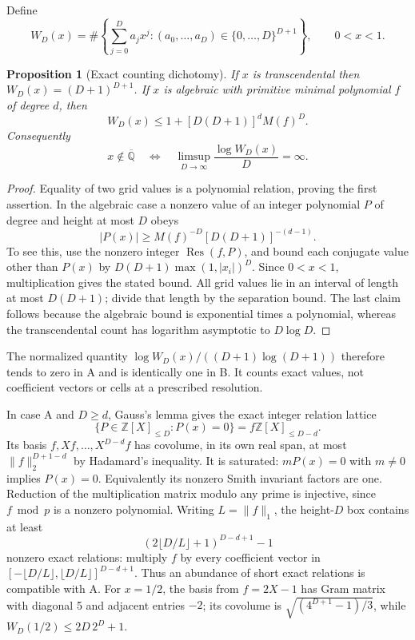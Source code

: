 \documentclass[11pt,a4paper]{article}
\newcommand{\Z}{\mathbb Z}
\newcommand{\Qbar}{\overline{\mathbb Q}}
\newtheorem{proposition}[theorem]{Proposition}
\theoremstyle{definition}
\theoremstyle{remark}
\numberwithin{equation}{section}
\begin{document}
Define
\[
 W_D(x)=\#\left\{\sum_{j=0}^D a_jx^j:
                 (a_0,\ldots,a_D)\in\{0,\ldots,D\}^{D+1}\right\},
 \qquad 0<x<1.
\]
\begin{proposition}[Exact counting dichotomy]\label{wr:prop-counting}
If \(x\) is transcendental then \(W_D(x)=(D+1)^{D+1}\). If \(x\) is
algebraic with primitive minimal polynomial \(f\) of degree \(d\), then
\begin{equation}\label{wr:eq-counting-bound}
 W_D(x)\le1+[D(D+1)]^d M(f)^D.
\end{equation}
Consequently
\[
 x\notin\Qbar
 \quad\Longleftrightarrow\quad
 \limsup_{D\to\infty}\frac{\log W_D(x)}D=\infty.
\]
\end{proposition}
\begin{proof}
Equality of two grid values is a polynomial relation, proving the first
assertion. In the algebraic case a nonzero value of an integer polynomial
\(P\) of degree and height at most \(D\) obeys
\[
 |P(x)|\ge M(f)^{-D}[D(D+1)]^{-(d-1)}.
\]
To see this, use the nonzero integer \(\operatorname{Res}(f,P)\), and
bound each conjugate value other than \(P(x)\) by
\(D(D+1)\max(1,|x_i|)^D\). Since \(0<x<1\), multiplication gives the
stated bound. All grid values lie in an interval of length at most
\(D(D+1)\); divide that length by the separation bound. The last claim
follows because the algebraic bound is exponential times a polynomial,
whereas the transcendental count has logarithm asymptotic to \(D\log D\).
\end{proof}

The normalized quantity \(\log W_D(x)/((D+1)\log(D+1))\) therefore tends
to zero in A and is identically one in B. It counts exact values, not
coefficient vectors or cells at a prescribed resolution.

In case A and \(D\ge d\), Gauss's lemma gives the exact integer relation
lattice
\begin{equation}\label{wr:eq-relation-lattice}
 \{P\in\Z[X]_{\le D}:P(x)=0\}=f\Z[X]_{\le D-d}.
\end{equation}
Its basis \(f,Xf,\ldots,X^{D-d}f\) has covolume, in its own real span,
at most \(\|f\|_2^{D+1-d}\) by Hadamard's inequality. It is saturated:
\(mP(x)=0\) with \(m\ne0\) implies \(P(x)=0\). Equivalently its nonzero
Smith invariant factors are one. Reduction of the multiplication matrix
modulo any prime is injective, since \(f\bmod p\) is a nonzero
polynomial. Writing \(L=\|f\|_1\), the height-\(D\) box contains at least
\begin{equation}\label{wr:eq-abundant-relations}
 (2\lfloor D/L\rfloor+1)^{D-d+1}-1
\end{equation}
nonzero exact relations: multiply \(f\) by every coefficient vector in
\([ -\lfloor D/L\rfloor,\lfloor D/L\rfloor]^{D-d+1}\). Thus an abundance
of short exact relations is compatible with A. For \(x=1/2\), the basis
from \(f=2X-1\) has Gram matrix with diagonal 5 and adjacent entries
\(-2\); its covolume is \(\sqrt{(4^{D+1}-1)/3}\), while
\(W_D(1/2)\le2D\,2^D+1\).
\end{document}
